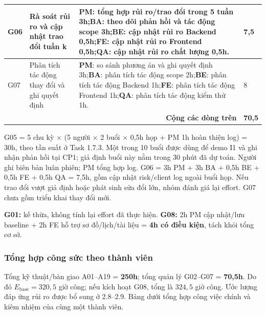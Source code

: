 \begin{table}[H]
\begin{tabularx}{\linewidth}{|p{0.8cm}|p{2.8cm}|>{\raggedright\arraybackslash}X|p{0.9cm}|}
G06 & Rà soát rủi ro và cập nhật trao đổi tuần k & \textbf{PM}: tổng hợp rủi ro/trao đổi trong 5 tuần 3h;\newline \textbf{BA}: theo dõi phản hồi và tác động scope 3h;\newline \textbf{BE}: cập nhật rủi ro Backend 0,5h;\newline \textbf{FE}: cập nhật rủi ro Frontend 0,5h;\newline \textbf{QA}: cập nhật rủi ro chất lượng 0,5h. & 7,5 \\ \hline
G07 & Phân tích tác động thay đổi và ghi quyết định & \textbf{PM}: so sánh phương án và ghi quyết định 3h;\newline \textbf{BA}: phân tích tác động scope 2h;\newline \textbf{BE}: phân tích tác động Backend 1h;\newline \textbf{FE}: phân tích tác động Frontend 1h;\newline \textbf{QA}: phân tích tác động kiểm thử 1h. & 8 \\ \hline
\multicolumn{3}{|r|}{\textbf{Cộng các dòng trên}} & \textbf{70,5} \\ \hline
\end{tabularx}
\end{table}

\noindent G05 = 5 chu kỳ $\times$ (5 người $\times$ 2 buổi $\times$ 0,5h họp + PM 1h hoàn thiện log) = 30h, theo tần suất ở Task 1.7.3. Một trong 10 buổi được dùng để demo I1 và ghi nhận phản hồi tại CP1; giả định buổi này nằm trong 30 phút đã dự toán. Người ghi biên bản luân phiên; PM tổng hợp log. G06 = 3h PM + 3h BA + 0,5h BE + 0,5h FE + 0,5h QA = 7,5h, gồm cập nhật risk/client log ngoài buổi họp. Nếu trao đổi vượt giả định hoặc phát sinh sửa đổi lớn, nhóm đánh giá lại effort. G07 chưa gồm triển khai thay đổi mới.

\medskip
\noindent \textbf{G01:} kế thừa, không tính lại effort đã thực hiện. \textbf{G08:} 2h PM cập nhật/lưu baseline + 2h FE hỗ trợ sơ đồ/lịch/tài liệu = \textbf{4h có điều kiện}, tách khỏi tổng cơ sở.
\newpage
\subsubsection{Tổng hợp công sức theo thành viên}
Tổng kỹ thuật/bàn giao A01--A19 = \textbf{250h}; tổng quản lý G02--G07 = \textbf{70,5h}. Do đó $E_{\mathrm{base}}=320{,}5$ giờ công; nếu kích hoạt G08, tổng là $324{,}5$ giờ công. Ước lượng đáp ứng rủi ro được bổ sung ở 2.8--2.9. Bảng dưới tổng hợp công việc chính và kiêm nhiệm của cùng một thành viên.

